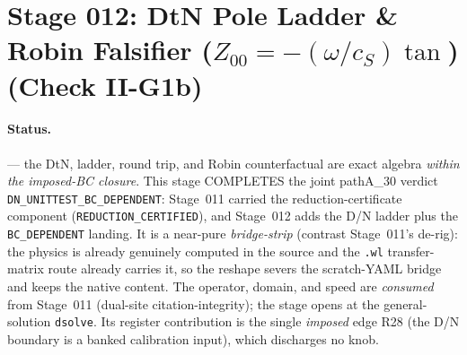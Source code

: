 \section{Stage 012: DtN Pole Ladder \texorpdfstring{\& Robin Falsifier (\(Z_{00}=-(\omega/c_S)\tan\))}{and Robin Falsifier} (Check II-G1b)}

\claimstatus{\StatusExactClosure}

\paragraph{Status.}
\StatusExactClosure{} --- the DtN, ladder, round trip, and Robin counterfactual
are exact algebra \emph{within the imposed-BC closure}. This stage COMPLETES the
joint pathA\_30 verdict \texttt{DN\_UNITTEST\_BC\_DEPENDENT}: Stage~011 carried
the reduction-certificate component (\texttt{REDUCTION\_CERTIFIED}), and Stage~012
adds the D/N ladder plus the \texttt{BC\_DEPENDENT} landing. It is a near-pure
\emph{bridge-strip} (contrast Stage~011's de-rig): the physics is already
genuinely computed in the source and the \texttt{.wl} transfer-matrix route
already carries it, so the reshape severs the scratch-YAML bridge and keeps the
native content. The operator, domain, and speed are \emph{consumed} from
Stage~011 (dual-site citation-integrity); the stage opens at the general-solution
\texttt{dsolve}. Its register contribution is the single \emph{imposed} edge R28
(the D/N boundary is a banked calibration input), which discharges no knob.

